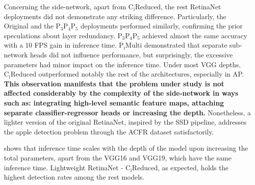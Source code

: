 Concerning the side-network, apart from $\text{C}_\text{i}\text{Reduced}$, the rest RetinaNet deployments did not demonstrate any striking difference. Particularly, the Original and the $\text{P}_3\text{P}_4\text{P}_5$ deployments performed similarly, confirming the prior speculations about layer redundancy. $\text{P}_3\text{P}_4\text{P}_5$ achieved almost the same accuracy with a 10 FPS gain in inference time. $\text{P}_\text{i}\text{Multi}$ demonstrated that separate sub-network heads did not influence performance, but surprisingly, the excessive parameters had minor impact on the inference time. Under most VGG depths, $\text{C}_\text{i}\text{Reduced}$ outperformed notably the rest of the architectures, especially in AP. \textbf{This observation manifests that the problem under study is not affected considerably by the complexity of the side-network in ways such as: integrating high-level semantic feature maps, attaching separate classifier-regressor heads or increasing the depth.} Nonetheless, a lighter version of the original RetinaNet, inspired by the SSD pipeline, addresses the apple detection problem through the ACFR dataset satisfactorily.

 shows that inference time scales with the depth of the model upon increasing the total parameters, apart from the VGG16 and VGG19, which have the same inference time. Lightweight RetinaNet - $\text{C}_\text{i}\text{Reduced}$, as expected, holds the highest detection rates among the rest models.

\begin{table}[!htb]
  \centering
  \caption{Inference time for every VGG. Detection rates depend heavily on the No. of parameters of the model and the input resolution. However, the transition from VGG16 to VGG19 did not show any change.}
  \label{ch5:tab3}
\end{table}

